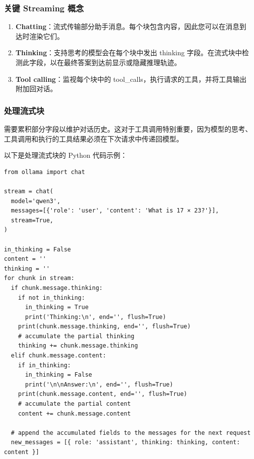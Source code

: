 \documentclass[12pt,UTF8]{ctexbook}
\begin{document}
\subsubsection{关键 Streaming 概念}
\begin{enumerate}
  \item \textbf{Chatting}：流式传输部分助手消息。每个块包含内容，因此您可以在消息到达时渲染它们。
  \item \textbf{Thinking}：支持思考的模型会在每个块中发出 thinking 字段。在流式块中检测此字段，以在最终答案到达前显示或隐藏推理轨迹。
  \item \textbf{Tool calling}：监视每个块中的 tool\_calls，执行请求的工具，并将工具输出附加回对话。
\end{enumerate}

\subsubsection{处理流式块}
需要累积部分字段以维护对话历史。这对于工具调用特别重要，因为模型的思考、工具调用和执行的工具结果必须在下次请求中传递回模型。

以下是处理流式块的 Python 代码示例：

\begin{verbatim}
from ollama import chat 

stream = chat( 
  model='qwen3', 
  messages=[{'role': 'user', 'content': 'What is 17 × 23?'}], 
  stream=True, 
)

in_thinking = False 
content = '' 
thinking = '' 
for chunk in stream: 
  if chunk.message.thinking: 
    if not in_thinking: 
      in_thinking = True 
      print('Thinking:\n', end='', flush=True) 
    print(chunk.message.thinking, end='', flush=True) 
    # accumulate the partial thinking 
    thinking += chunk.message.thinking 
  elif chunk.message.content: 
    if in_thinking: 
      in_thinking = False 
      print('\n\nAnswer:\n', end='', flush=True) 
    print(chunk.message.content, end='', flush=True) 
    # accumulate the partial content 
    content += chunk.message.content

  # append the accumulated fields to the messages for the next request 
  new_messages = [{ role: 'assistant', thinking: thinking, content: content }]
\end{verbatim}
\end{document}
